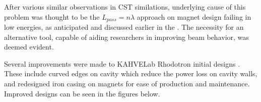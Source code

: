 \documentclass{article}
\begin{document}
After various similar observations in CST similations, underlying cause of this problem was thought to be the $L_{pass} = n \lambda$ approach on magnet design failing in low energies, 
as anticipated and discussed earlier in the .
The necessity for an alternative tool, capable of aiding researchers in improving beam behavior, was deemed evident.

Several improvements were made to KAHVELab Rhodotron initial designs \cite{sinan}. These include curved edges on cavity which reduce the power loss on cavity walls, and redesigned iron casing on magnets for ease of production and maintenance.
Improved designs can be seen in the figures below.

\end{document}
